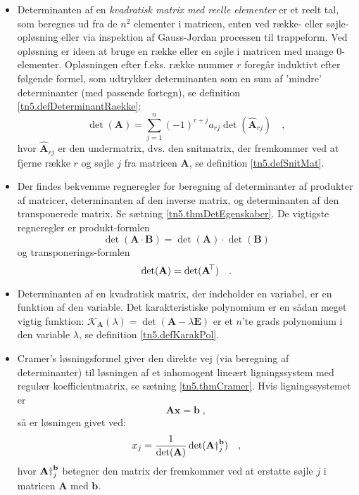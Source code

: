 
\begin{summary}
\begin{itemize}
\item Determinanten af en  \emph{kvadratisk matrix med reelle elementer} er et reelt tal, som beregnes ud fra de $n^{2}$ elementer i matricen, enten ved række- eller søjle-opløsning eller via inspektion af Gauss-Jordan processen til trappeform. Ved opløsning er ideen at bruge en række eller en søjle i matricen med mange $0$-elementer. Opløsningen efter f.eks. række nummer $r$ foregår induktivt efter følgende formel, som udtrykker determinanten som en sum af 'mindre' determinanter (med passende fortegn), se definition \ref{tn5.defDeterminantRaekke}:
    \begin{equation}
    \det(\mathbf{A}) = \sum_{j=1}^{n}(-1)^{r+j}a_{rj}\det(\widehat{\mathbf{A}}_{rj})\quad ,
    \end{equation}
    hvor $\widehat{\mathbf{A}}_{rj}$ er den undermatrix, dvs. den snitmatrix, der fremkommer ved at fjerne række $r$ og søjle $j$ fra matricen $\mathbf{A}$, se definition \ref{tn5.defSnitMat}.

\item Der findes bekvemme regneregler for beregning af determinanter af produkter af matricer, determinanten af den inverse matrix, og determinanten af den trans\-po\-ne\-re\-de matrix. Se sætning \ref{tn5.thmDetEgenskaber}. De vigtigste regneregler er produkt-formlen $$\det(\mathbf{A}\cdot\mathbf{B}) = \det(\mathbf{A})\cdot\det(\mathbf{B})$$ og transponerings-formlen $$\det(\mathbf{A}) = \det(\mathbf{A}\hspace*{-.6mm}^{\top}) \quad .$$

\item Determinanten af en kvadratisk matrix, der indeholder en variabel, er en funktion af den variable. Det karakteristiske polynomium er en sådan meget vigtig funktion: $\mathcal{K}_{\mathbf{A}}(\lambda) = \det(\mathbf{A} - \lambda \mathbf{E})$ er et $n$'te grads polynomium i den variable $\lambda$, se definition \ref{tn5.defKarakPol}.

\item Cramer's løsningsformel giver den direkte vej (via beregning af determinanter) til løsningen af et inhomogent lineært ligningssystem med regulær koefficientmatrix, se sætning \ref{tn5.thmCramer}. Hvis ligningssystemet er
    \begin{equation}
\mathbf{A}\mathbf{x} = \mathbf{b} \;,
\end{equation}
så er løsningen givet ved:
\begin{equation}
x_{j} = \frac{1}{\det(\mathbf{A})}\det(\mathbf{A}\dag_{\small{j}}^{\mathbf{b}}) \quad ,
\end{equation}
hvor $\mathbf{A}\dag_{\small{j}}^{\mathbf{b}}$ betegner den matrix der fremkommer ved at erstatte søjle $j$ i matricen $\mathbf{A}$ med $\mathbf{b}$.

\end{itemize}

\end{summary}


